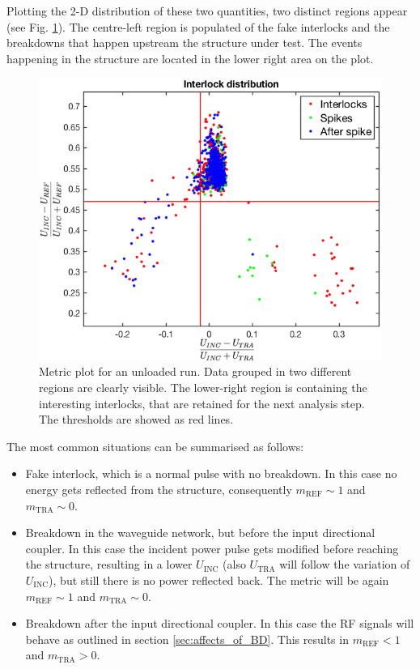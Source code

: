 Plotting the 2-D distribution of these two quantities, two distinct regions appear (see Fig. \ref{Metric_plot}). The centre-left region is populated of the fake interlocks and the breakdowns that happen upstream the structure under test. The events happening in the structure are located in the lower right area on the plot. 

\begin{figure}[h]
\centering 
\includegraphics[scale=0.46]{pictures/metric_plt.png}
\caption{Metric plot for an unloaded run. Data grouped in two different regions are clearly visible. The lower-right region is containing the interesting interlocks, that are retained for the next analysis step. The thresholds are showed as red lines.}
\label{Metric_plot}
\end{figure}


The most common situations can be summarised as follows:
\begin{itemize}
\item Fake interlock, which is a normal pulse with no breakdown. In this case no energy gets reflected from the structure, consequently $m_\text{REF} \sim 1$ and  $m_\text{TRA} \sim 0$.
\item Breakdown in the waveguide network, but before the input directional coupler. In this case the incident power pulse gets modified before reaching the structure, resulting in a lower $U_\text{INC}$ (also $U_\text{TRA}$ will follow the variation of $U_\text{INC}$), but still there is no power reflected back. The metric will be again $m_\text{REF} \sim 1$ and  $m_\text{TRA} \sim 0$.
\item Breakdown after the input directional coupler. In this case the RF signals will behave as outlined in section \ref{sec:affects_of_BD}. This results in $m_\text{REF} <1$ and  $m_\text{TRA} > 0$.
\end{itemize}

